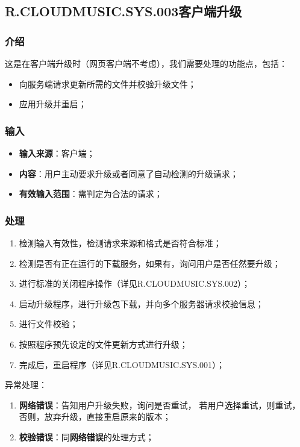 \subsection{R.CLOUDMUSIC.SYS.003客户端升级}
\subsubsection{介绍}
	这是在客户端升级时（网页客户端不考虑），我们需要处理的功能点，包括：
	\begin{itemize}
		\item 向服务端请求更新所需的文件并校验升级文件；
		\item 应用升级并重启；
	\end{itemize}
\subsubsection{输入}
	\begin{itemize}
		\item \textbf{输入来源}：客户端；
		\item \textbf{内容}：用户主动要求升级或者同意了自动检测的升级请求；
		\item \textbf{有效输入范围}：需判定为合法的请求；
	\end{itemize}
\subsubsection{处理}
	\begin{enumerate}
		\item 检测输入有效性，检测请求来源和格式是否符合标准；
		\item 检测是否有正在运行的下载服务，如果有，询问用户是否任然要升级；
		\item 进行标准的关闭程序操作（详见R.CLOUDMUSIC.SYS.002）；
		\item 启动升级程序，进行升级包下载，并向多个服务器请求校验信息；
		\item 进行文件校验；
		\item 按照程序预先设定的文件更新方式进行升级；
		\item 完成后，重启程序（详见R.CLOUDMUSIC.SYS.001）；
	\end{enumerate}
	\noindent 异常处理：
	\begin{enumerate}
		\item \textbf{网络错误}：告知用户升级失败，询问是否重试，
			若用户选择重试，则重试，否则，放弃升级，直接重启原来的版本；
		\item \textbf{校验错误}：同\textbf{网络错误}的处理方式；
	\end{enumerate}

